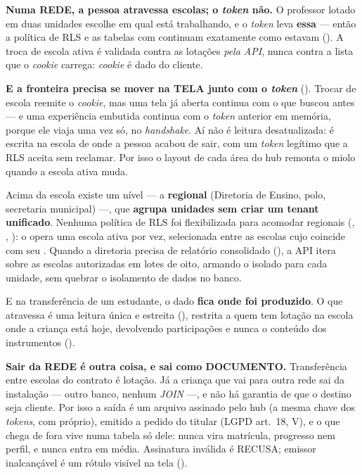 \begin{decisao}
\textbf{Numa REDE, a pessoa atravessa escolas; o \emph{token} não.} O professor
lotado em duas unidades escolhe em qual está trabalhando, e o \emph{token} leva
\textbf{essa} --- então a política de RLS e as tabelas com 
continuam exatamente como estavam (). A troca de escola ativa é
validada contra as lotações \emph{pela API}, nunca contra a lista que o
\emph{cookie} carrega: \emph{cookie} é dado do cliente.

\textbf{E a fronteira precisa se mover na TELA junto com o \emph{token}}
(). Trocar de escola reemite o \emph{cookie}, mas uma tela já
aberta continua com o que buscou antes --- e uma experiência embutida continua
com o \emph{token} anterior em memória, porque ele viaja uma vez só, no
\emph{handshake}. Aí não é leitura desatualizada: é escrita na escola de onde a
pessoa acabou de sair, com um \emph{token} legítimo que a RLS aceita sem
reclamar. Por isso o layout de cada área do hub remonta o miolo quando a escola
ativa muda.

Acima da escola existe um nível --- a \textbf{regional} (Diretoria de Ensino,
polo, secretaria municipal) ---, que \textbf{agrupa unidades sem criar um tenant
unificado}. Nenhuma política de RLS foi flexibilizada para acomodar regionais
(, , ): o  opera
uma escola ativa por vez, selecionada entre as escolas cujo
 coincide com seu . Quando a
diretoria precisa de relatório consolidado (), a API itera sobre
as escolas autorizadas em lotes de oito, armando o  isolado
para cada unidade, sem quebrar o isolamento de dados no banco.

E na transferência de um estudante, o dado \textbf{fica onde foi produzido}. O que
atravessa é uma leitura única e estreita (),
restrita a quem tem lotação na escola onde a criança está hoje, devolvendo
participações e nunca o conteúdo dos instrumentos ().
\end{decisao}

\begin{decisao}
\textbf{Sair da REDE é outra coisa, e sai como DOCUMENTO.} Transferência entre
escolas do contrato é lotação. Já a criança que vai para outra rede sai da
instalação --- outro banco, nenhum \emph{JOIN} ---, e não há garantia de que o
destino seja cliente. Por isso a saída é um arquivo assinado pelo hub (a mesma
chave dos \emph{tokens}, com  próprio), emitido a pedido do titular
(LGPD art.~18, V), e o que chega de fora vive numa tabela só dele: nunca vira
matrícula, progresso nem perfil, e nunca entra em média. Assinatura inválida é
RECUSA; emissor inalcançável é um rótulo visível na tela ().
\end{decisao}

